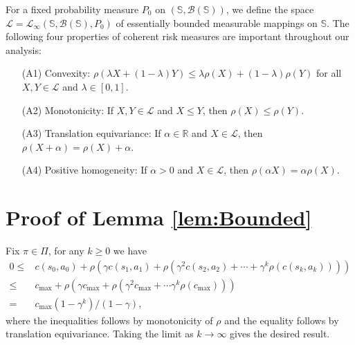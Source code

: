 \documentclass[12pt,technote,onecolumn]{IEEEtran}
\begin{document}
For a fixed probability measure $P_{0}$ on $\left(\mathbb{S},\mathcal{B}\left(\mathbb{S}\right)\right)$,
we define the space $\mathcal{L}=\mathcal{L}_{\infty}\left(\mathbb{S},\mathcal{B}\left(\mathbb{S}\right),P_{0}\right)$
of essentially bounded measurable mappings on $\mathbb{S}$. The following
four properties of coherent risk measures are important throughout our analysis:
\begin{enumerate}
	\item [(A1)] Convexity: $\rho\left(\lambda X+\left(1-\lambda\right)Y\right)\leq\lambda\rho\left(X\right)+\left(1-\lambda\right)\rho\left(Y\right)$
	for all $X,Y\in\mathcal{L}$ and $\lambda\in\left[0,1\right]$.
	\item [(A2)] Monotonicity: If $X,Y\in\mathcal{L}$ and $X\leq Y$, then
	$\rho\left(X\right)\leq\rho\left(Y\right)$.
	\item [(A3)] Translation equivariance: If $\alpha\in\mathbb{R}$ and $X\in\mathcal{L}$,
	then $\rho\left(X+\alpha\right)=\rho\left(X\right)+\alpha$.
	\item [(A4)] Positive homogeneity: If $\alpha>0$ and $X\in\mathcal{L}$,
	then $\rho\left(\alpha X\right)=\alpha\rho\left(X\right)$.
\end{enumerate}

\section*{Proof of Lemma \ref{lem:Bounded}}
\begin{IEEEproof}
	Fix $\pi\in\Pi$, for any $k\geq0$ we have
	\begin{equation*}
	\begin{aligned}
	0\leq & c(s_{0},a_{0})+\rho(\gamma c(s_{1},a_{1})
	+\rho(\gamma^{2}c(s_{2},a_{2})+\cdots+\gamma^{k}\rho(c(s_{k},a_{k}))))\\
	\leq& c_{\max}+\rho\left(\gamma c_{\max}+\rho\left(\gamma^{2}c_{\max}+\cdots\gamma^{k}\rho\left(c_{\max}\right)\right)\right)\\
	= & c_{\max}\left(1-\gamma^{k}\right)/\left(1-\gamma\right),
	\end{aligned}
	\end{equation*}
	where the inequalities follows by monotonicity of $\rho$ and the
	equality follows by translation equivariance. Taking the limit as
	$k\rightarrow\infty$ gives the desired result.
\end{IEEEproof}
\end{document}

